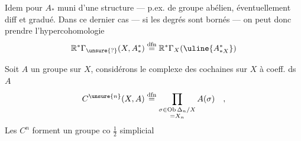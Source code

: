 
Idem pour $A_*$ muni d'une structure  --- p.ex. de groupe abélien, éventuellement diff et gradué. Dans ce dernier cas --- si les degrés sont bornés  --- on peut donc prendre l'hypercohomologie
\[
\mathbb R^*\Gamma_{\unsure{?}}(X,A_*^*)
\overset{\mathrm{dfn}}{=}
\mathbb R^*\Gamma_X(\uline{A_{*X}^*})
\]


Soit $A$ un groupe sur $X$, considérons le complexe des cochaines sur $X$ à coeff. ds $A$
\[
C^{\unsure{n}}(X,A)\overset{\mathrm{dfn}}{=}
\prod_{\substack{\sigma\in\operatorname{Ob}\Delta_n/X\\=X_n}}A(\sigma)\quad,
\]
Les $C^n$ forment un groupe co $\frac12$ simplicial

